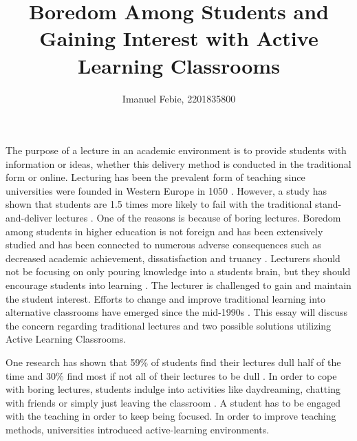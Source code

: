 \documentclass[12pt]{article}
\begin{document}
\title{Boredom Among Students and Gaining Interest with Active Learning Classrooms}
\author{Imanuel Febie, 2201835800}
\maketitle

The purpose of a lecture in an academic environment is to provide students with information or ideas, whether this delivery method is conducted in the traditional form or online. Lecturing has been the prevalent form of teaching since universities were founded in Western Europe in 1050 \cite{bajak2014lectures}. However, a study has shown that students are 1.5 times more likely to fail with the traditional stand-and-deliver lectures \cite{freeman-active-learning-2014}. One of the reasons is because of boring lectures. Boredom among students in higher education is not foreign and has been extensively studied and has been connected to numerous adverse consequences such as decreased academic achievement, dissatisfaction and truancy \cite{boredom-among-students}. Lecturers should not be focusing on only pouring knowledge into a students brain, but they should encourage students into learning \cite{satisfaction-active-learning}. The lecturer is challenged to gain and maintain the student interest. Efforts to change and improve traditional learning into alternative classrooms have emerged since the mid-1990s \cite{guide-to-teaching-alc}. This essay will discuss the concern regarding traditional lectures and two possible solutions utilizing Active Learning Classrooms.

One research has shown that 59\% of students find their lectures dull half of the time and 30\% find most if not all of their lectures to be dull \cite{boredom-among-students}. In order to cope with boring lectures, students indulge into activities like daydreaming, chatting with friends or simply just leaving the classroom \cite{predictors-of-boredom}. A student has to be engaged with the teaching in order to keep being focused. In order to improve teaching methods, universities introduced active-learning environments. 




\newpage



\end{document}
